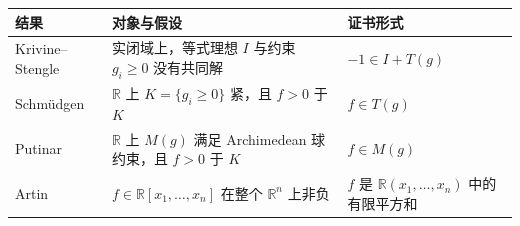 \begin{tabularx}{\textwidth}{@{}>{\raggedright\arraybackslash}p{}>{\raggedright\arraybackslash}p{}>{\raggedright\arraybackslash}X@{}}
	\toprule
	结果 & 对象与假设 & 证书形式 \\
	\midrule
	Krivine--Stengle & 实闭域上，等式理想 \(I\) 与约束 \(g_i\ge0\) 没有共同解 & \(-1\in I+T(g)\) \\
	Schmüdgen & \(\mathbb R\) 上 \(K=\{g_i\ge0\}\) 紧，且 \(f>0\) 于 \(K\) & \(f\in T(g)\) \\
	Putinar & \(\mathbb R\) 上 \(M(g)\) 满足 Archimedean 球约束，且 \(f>0\) 于 \(K\) & \(f\in M(g)\) \\
	Artin & \(f\in\mathbb R[x_1,\ldots,x_n]\) 在整个 \(\mathbb R^n\) 上非负 & \(f\) 是 \(\mathbb R(x_1,\ldots,x_n)\) 中的有限平方和 \\
	\bottomrule
\end{tabularx}
